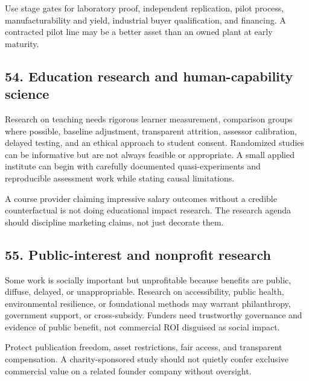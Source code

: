 Use stage gates for laboratory proof, independent replication, pilot process, manufacturability and yield, industrial buyer qualification, and financing. A contracted pilot line may be a better asset than an owned plant at early maturity.

\subsection{54. Education research and human-capability science}

Research on teaching needs rigorous learner measurement, comparison groups where possible, baseline adjustment, transparent attrition, assessor calibration, delayed testing, and an ethical approach to student consent. Randomized studies can be informative but are not always feasible or appropriate. A small applied institute can begin with carefully documented quasi-experiments and reproducible assessment work while stating causal limitations.

A course provider claiming impressive salary outcomes without a credible counterfactual is not doing educational impact research. The research agenda should discipline marketing claims, not just decorate them.

\subsection{55. Public-interest and nonprofit research}

Some work is socially important but unprofitable because benefits are public, diffuse, delayed, or unappropriable. Research on accessibility, public health, environmental resilience, or foundational methods may warrant philanthropy, government support, or cross-subsidy. Funders need trustworthy governance and evidence of public benefit, not commercial ROI disguised as social impact.

Protect publication freedom, asset restrictions, fair access, and transparent compensation. A charity-sponsored study should not quietly confer exclusive commercial value on a related founder company without oversight.
